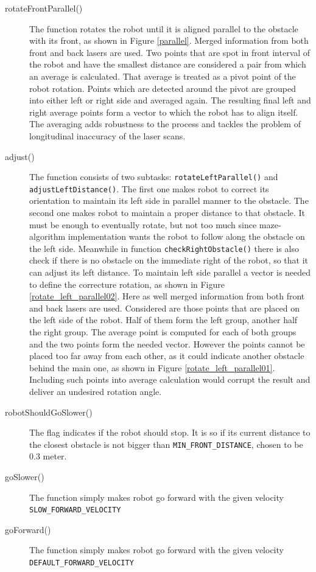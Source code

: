 \begin{description}
\item[rotateFrontParallel()] The function rotates the robot until it is aligned parallel to the obstacle with its front, as shown in Figure \ref{parallel}. Merged information from both front and back lasers are used. Two points that are spot in front interval of the robot and have the smallest distance are considered a pair from which an average is calculated. That average is treated as a pivot point of the robot rotation. Points which are detected around the pivot are grouped into either left or right side and averaged again. The resulting final left and right average points form a vector to which the robot has to align itself. The averaging adds robustness to the process and tackles the problem of longitudinal inaccuracy of the laser scans.
\item[adjust()] The function consists of two subtasks: \texttt{rotateLeftParallel()} and \texttt{adjustLeftDistance()}. The first one makes robot to correct its orientation to maintain its left side in parallel manner to the obstacle. The second one makes robot to maintain a proper distance to that obstacle. It must be enough to eventually rotate, but not too much since maze-algorithm implementation wants the robot to follow along the obstacle on the left side. Meanwhile in function \texttt{checkRightObstacle()} there is also check if there is no obstacle on the immediate right of the robot, so that it can adjust its left distance.  To maintain left side parallel a vector is needed to define the correcture rotation, as shown in Figure \ref{rotate_left_parallel02}. Here as well merged information from both front and back lasers are used. Considered are those points that are placed on the left side of the robot. Half of them form the left group, another half the right group. The average point is computed for each of both groups and the two points form the needed vector. However the points cannot be placed too far away from each other, as it could indicate another obstacle behind the main one, as shown in Figure \ref{rotate_left_parallel01}. Including such points into average calculation would corrupt the result and deliver an undesired rotation angle.
\item[robotShouldGoSlower()]  The flag indicates if the robot should stop. It is so if its current distance to the closest obstacle is not bigger than \texttt{MIN\_FRONT\_DISTANCE}, chosen to be 0.3 meter. 
\item[goSlower()] The function simply makes robot go forward with the given velocity \texttt{SLOW\_FORWARD\_VELOCITY}
\item[goForward()] The function simply makes robot go forward with the given velocity \texttt{DEFAULT\_FORWARD\_VELOCITY} 
\end{description}

